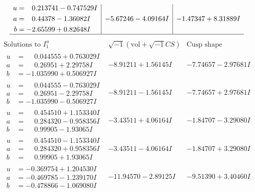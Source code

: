 \documentclass[1p]{elsarticle_modified}
\theoremstyle{definition}
\newcommand{\I}{\sqrt{-1}}
\begin{document}
$$\begin{array}{c|c|c}
\begin{aligned}
u &= \phantom{-}0.213741 - 0.747529 I \\
a &= \phantom{-}0.44378 - 1.36082 I \\
b &= -2.65599 + 0.82648 I\end{aligned}
 & -5.67246 - 4.09164 I & -1.47347 + 8.31889 I\\
 \hline 
 \end{array}$$\newpage$$\begin{array}{c|c|c}  
\text{Solutions to }I^u_{1}& \I (\text{vol} + \sqrt{-1}CS) & \text{Cusp shape}\\
 \hline 
\begin{aligned}
u &= \phantom{-}0.044555 + 0.763029 I \\
a &= \phantom{-}0.26951 + 2.29758 I \\
b &= -1.035990 + 0.506927 I\end{aligned}
 & -8.91211 + 1.56145 I & -7.74657 - 2.97681 I \\ \hline\begin{aligned}
u &= \phantom{-}0.044555 - 0.763029 I \\
a &= \phantom{-}0.26951 - 2.29758 I \\
b &= -1.035990 - 0.506927 I\end{aligned}
 & -8.91211 - 1.56145 I & -7.74657 + 2.97681 I \\ \hline\begin{aligned}
u &= \phantom{-}0.454510 + 1.153340 I \\
a &= \phantom{-}0.284320 - 0.958356 I \\
b &= \phantom{-}0.99905 - 1.93065 I\end{aligned}
 & -3.43511 + 4.06164 I & -1.84707 - 3.29080 I \\ \hline\begin{aligned}
u &= \phantom{-}0.454510 - 1.153340 I \\
a &= \phantom{-}0.284320 + 0.958356 I \\
b &= \phantom{-}0.99905 + 1.93065 I\end{aligned}
 & -3.43511 - 4.06164 I & -1.84707 + 3.29080 I \\ \hline\begin{aligned}
u &= -0.369754 + 1.204530 I \\
a &= -0.469785 - 1.239170 I \\
b &= -0.478866 - 1.069080 I\end{aligned}
 & -11.94570 - 2.89125 I & -9.51390 + 3.40460 I \\ \hline\begin{aligned}

\end{aligned}
\end{array}$$
\end{document}
